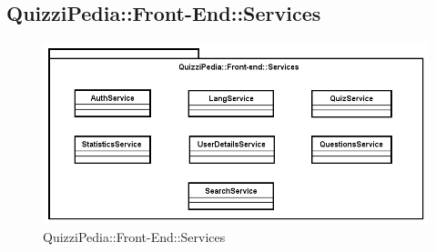 \newpage
\subsection{QuizziPedia::Front-End::Services}
\begin{figure}[ht]
	\centering
	\includegraphics[scale=0.50]{UML/Package/QuizziPedia_Front-End_Services.png}
	\caption{QuizziPedia::Front-End::Services}
\end{figure} \FloatBarrier


